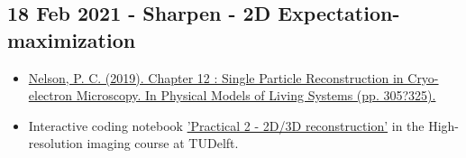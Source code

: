 \documentclass[11pt, oneside]{article}   	%
\begin{document}
\subsection{18 Feb 2021 - Sharpen - 2D Expectation-maximization}
\begin{itemize}
	\item \href{https://repository.upenn.edu/cgi/viewcontent.cgi?article=1665&context=physics_papers}{Nelson, P. C. (2019). Chapter 12 : Single Particle Reconstruction in Cryo-electron Microscopy. In Physical Models of Living Systems (pp. 305?325).}
	\item Interactive coding notebook \href{https://gitlab.tudelft.nl/aj-lab/teaching/-/wikis/NB4020}{'Practical 2 - 2D/3D reconstruction'} in the High-resolution imaging course at TUDelft.
\end{itemize}
\end{document}
